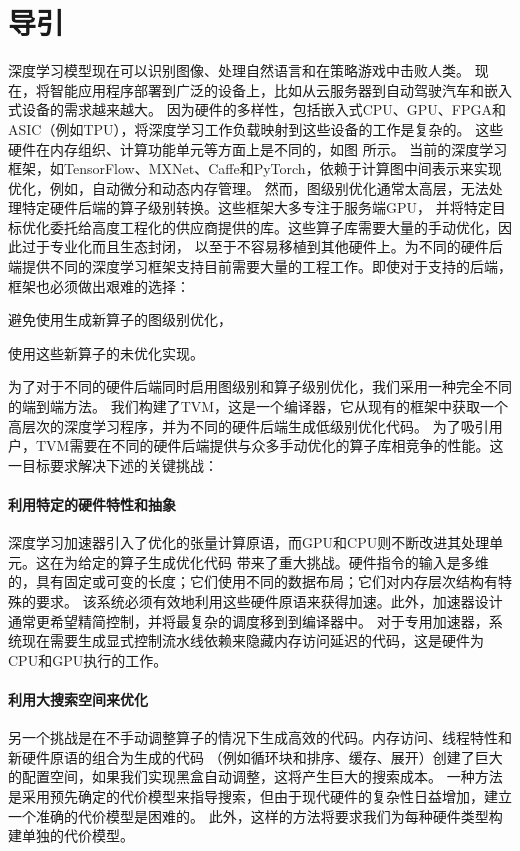 \section{导引}
深度学习模型现在可以识别图像、处理自然语言和在策略游戏中击败人类。
现在，将智能应用程序部署到广泛的设备上，比如从云服务器到自动驾驶汽车和嵌入式设备的需求越来越大。
因为硬件的多样性，包括嵌入式CPU、GPU、FPGA和ASIC（例如TPU），将深度学习工作负载映射到这些设备的工作是复杂的。
这些硬件在内存组织、计算功能单元等方面上是不同的，如图  所示。
当前的深度学习框架，如TensorFlow、MXNet、Caffe和PyTorch，依赖于计算图中间表示来实现优化，例如，自动微分和动态内存管理。
然而，图级别优化通常太高层，无法处理特定硬件后端的算子级别转换。这些框架大多专注于服务端GPU，
并将特定目标优化委托给高度工程化的供应商提供的库。这些算子库需要大量的手动优化，因此过于专业化而且生态封闭，
以至于不容易移植到其他硬件上。为不同的硬件后端提供不同的深度学习框架支持目前需要大量的工程工作。即使对于支持的后端，
框架也必须做出艰难的选择：
\begin{enumerate*}
    \item 避免使用生成新算子的图级别优化，
    \item 使用这些新算子的未优化实现。
\end{enumerate*}

为了对于不同的硬件后端同时启用图级别和算子级别优化，我们采用一种完全不同的端到端方法。
我们构建了TVM，这是一个编译器，它从现有的框架中获取一个高层次的深度学习程序，并为不同的硬件后端生成低级别优化代码。
为了吸引用户，TVM需要在不同的硬件后端提供与众多手动优化的算子库相竞争的性能。这一目标要求解决下述的关键挑战：

\paragraph{利用特定的硬件特性和抽象}
深度学习加速器引入了优化的张量计算原语，而GPU和CPU则不断改进其处理单元。这在为给定的算子生成优化代码
带来了重大挑战。硬件指令的输入是多维的，具有固定或可变的长度；它们使用不同的数据布局；它们对内存层次结构有特殊的要求。
该系统必须有效地利用这些硬件原语来获得加速。此外，加速器设计通常更希望精简控制，并将最复杂的调度移到到编译器中。
对于专用加速器，系统现在需要生成显式控制流水线依赖来隐藏内存访问延迟的代码，这是硬件为CPU和GPU执行的工作。

\paragraph{利用大搜索空间来优化}
另一个挑战是在不手动调整算子的情况下生成高效的代码。内存访问、线程特性和新硬件原语的组合为生成的代码
（例如循环块和排序、缓存、展开）创建了巨大的配置空间，如果我们实现黑盒自动调整，这将产生巨大的搜索成本。
一种方法是采用预先确定的代价模型来指导搜索，但由于现代硬件的复杂性日益增加，建立一个准确的代价模型是困难的。
此外，这样的方法将要求我们为每种硬件类型构建单独的代价模型。

